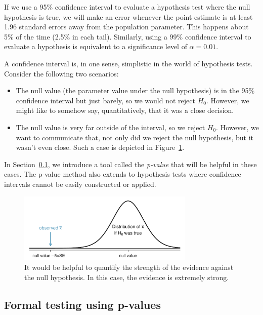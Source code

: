 If we use a 95\% confidence interval to evaluate a hypothesis test where the null hypothesis is true, we will make an error whenever the point estimate is at least 1.96 standard errors away from the population parameter. This happens about 5\% of the time (2.5\% in each tail). Similarly, using a 99\% confidence interval to evaluate a hypothesis is equivalent to a significance level of $\alpha = 0.01$.

A confidence interval is, in one sense, simplistic in the world of hypothesis tests. Consider the following two scenarios:
\begin{itemize}
\setlength{\itemsep}{0mm}
\item The null value (the parameter value under the null hypothesis) is in the 95\% confidence interval but just barely, so we would not reject $H_0$. However, we might like to somehow say, quantitatively, that it was a close decision.
\item The null value is very far outside of the interval, so we reject $H_0$. However, we want to communicate that, not only did we reject the null hypothesis, but it wasn't even close. Such a case is depicted in Figure~\ref{whyWeWantPValue}.
\end{itemize}
In Section~\ref{pValue}, we introduce a tool called the \emph{p-value} that will be helpful in these cases. The p-value method also extends to hypothesis tests where confidence intervals cannot be easily constructed or applied.

\begin{figure}%
\centering
\includegraphics[width=0.75\textwidth]{ch_inference_foundations/figures/whyWeWantPValue/whyWeWantPValue}
\caption{It would be helpful to quantify the strength of the evidence against the null hypothesis. In this case, the evidence is extremely strong.}
\label{whyWeWantPValue}
\end{figure}


\subsection{Formal testing using p-values}
\label{pValue}

